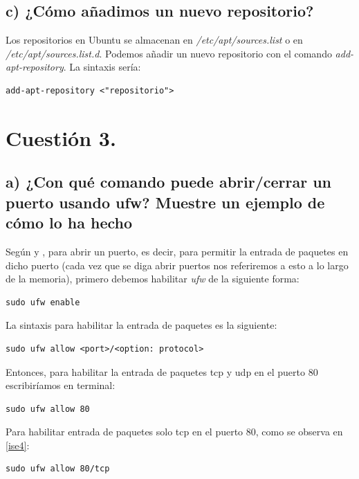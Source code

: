 \subsection{c) ¿Cómo añadimos un nuevo repositorio?}

Los repositorios en Ubuntu se almacenan en \textit{/etc/apt/sources.list} o en \textit{/etc/apt/sources.list.d}. Podemos añadir un nuevo repositorio con el comando \textit{add-apt-repository}.
La sintaxis sería:

\begin{verbatim}
add-apt-repository <"repositorio">
\end{verbatim}
\newpage

\section{Cuestión 3.}

\subsection{a) ¿Con qué comando puede abrir/cerrar un puerto usando ufw? Muestre un ejemplo de cómo lo ha hecho}

Según \cite{ufw} y \cite{ufw2}, para abrir un puerto, es decir, para permitir la entrada de paquetes en dicho puerto (cada vez que se diga abrir puertos nos referiremos a esto a lo largo de la memoria), primero debemos habilitar \textit{ufw} de la siguiente forma:

\begin{verbatim}
sudo ufw enable
\end{verbatim}

La sintaxis para habilitar la entrada de paquetes es la siguiente:

\begin{verbatim}
sudo ufw allow <port>/<option: protocol>
\end{verbatim}

Entonces, para habilitar la entrada de paquetes tcp y udp en el puerto 80 escribiríamos en terminal:

\begin{verbatim}
sudo ufw allow 80
\end{verbatim}

Para habilitar entrada de paquetes solo tcp en el puerto 80, como se observa en \ref{ise4}:

\begin{verbatim}
sudo ufw allow 80/tcp
\end{verbatim}

